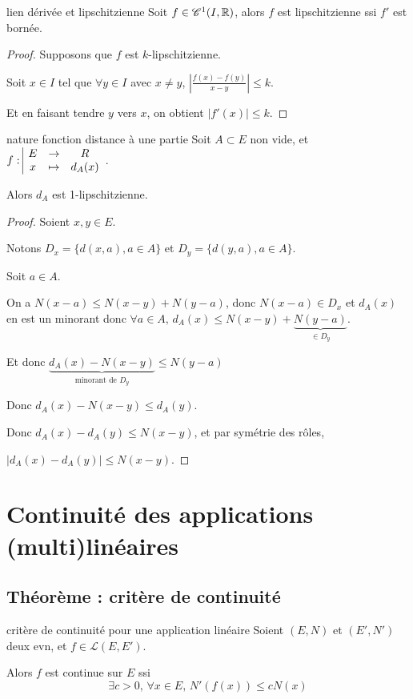 \begin{theoreme}{lien dérivée et lipschitzienne}{}
    Soit $f \in \mathscr C^1(I, \mathbb{R})$, alors $f$ est lipschitzienne ssi $f'$ est bornée.
\end{theoreme}


\begin{proof}
    Supposons que $f$ est $k$-lipschitzienne. 

    Soit $x \in I$ tel que $\forall y \in I$ avec $x \neq y$, $\left|\frac{f(x) - f(y) }{x - y}\right| \leqslant k$. 

    Et en faisant tendre $y$ vers $x$, on obtient $|f'(x)| \leqslant k$.
\end{proof}

\begin{proposition}{nature fonction distance à une partie}{}
    Soit $A \subset E$ non vide, et $f: \space \begin{array}{|ccc} \displaystyle E & \to & \displaystyle R \\ \displaystyle x & \mapsto & \displaystyle d_A(x) \end{array}$. 

    Alors $d_A$ est 1-lipschitzienne. 
\end{proposition}

\begin{proof}
    Soient $x, y \in E$. 

    Notons $D_x = \{d(x, a), a \in A\}$ et $D_y = \{d(y, a), a \in A\}$.

    Soit $a \in A$. 

    On a $N(x - a) \leqslant N(x - y) + N(y - a)$, donc $N(x - a) \in D_x$ et 
    $d_A(x)$ en est un minorant donc $\forall a \in A, \, d_A(x) \leqslant N(x - y) + \underbrace{N(y - a)}_{\in D_y}$.

    Et donc $\underbrace{d_A(x) - N(x - y)}_{\text{minorant de } D_y} \leqslant N(y - a)$

    Donc $d_A(x) - N(x - y) \leqslant d_A(y)$.

    Donc $d_A(x) - d_A(y) \leqslant N(x - y)$, et par symétrie des rôles, 

    $|d_A(x) - d_A(y)| \leqslant N(x - y)$.
\end{proof}


\section{Continuité des applications (multi)linéaires}
\subsection{Théorème : critère de continuité }

\begin{theorement}{critère de continuité pour une application linéaire}{}
    Soient $(E, N)$ et $(E', N')$ deux evn, et $ f \in \mathscr L(E, E')$.

    Alors $f$ est continue sur $E$ ssi 
    $$\exists c > 0, \, \forall x \in E, \, N'(f(x)) \leqslant c N(x)$$
\end{theorement}

